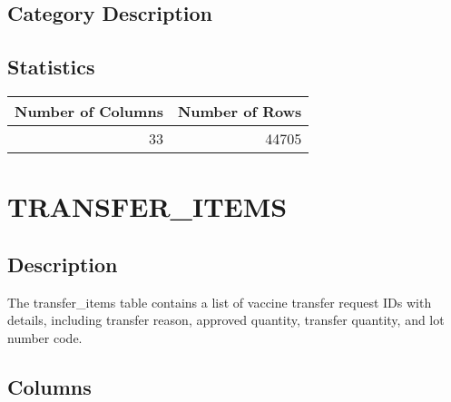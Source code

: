 \documentclass[
  letterpaper,
  DIV=11,
  numbers=noendperiod]{scrreprt}
\begin{document}
\hypertarget{category-description-40}{%
\section*{Category Description}\label{category-description-40}}

\hypertarget{statistics-40}{%
\section*{Statistics}\label{statistics-40}}

\begin{longtable}{rr}
\toprule
Number of Columns & Number of Rows \\ 
\midrule
33 & 44705 \\ 
\bottomrule
\end{longtable}

\hypertarget{transfer_items}{%
\chapter*{TRANSFER\_ITEMS}\label{transfer_items}}

\hypertarget{description-41}{%
\section*{Description}\label{description-41}}

The transfer\_items table contains a list of vaccine transfer request
IDs with details, including transfer reason, approved quantity, transfer
quantity, and lot number code.

\hypertarget{columns-41}{%
\section*{Columns}\label{columns-41}}
\end{document}
